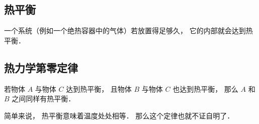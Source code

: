 
\begin{issues}
\issueDraft
\end{issues}

\subsection{热平衡}
一个系统（例如一个绝热容器中的气体）若放置得足够久， 它的内部就会达到热平衡．

\subsection{热力学第零定律}
若物体 $A$ 与物体 $C$ 达到热平衡， 且物体 $B$ 与物体 $C$ 也达到热平衡， 那么 $A$ 和 $B$ 之间同样有热平衡．

简单来说， 热平衡意味着温度处处相等． 那么这个定律也就不证自明了．

